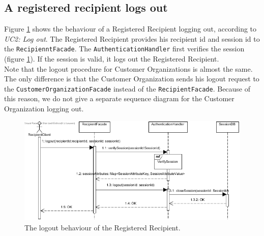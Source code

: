 \documentclass[a4paper,10pt]{article}
\begin{document}
\subsection{A registered recipient logs out}
\label{scenario:RegRecipLogOut}
Figure \ref{fig:seq_UC2LogOut} shows the behaviour of a Registered Recipient logging out, according to \emph{UC2: Log out}. The Registered Recipient provides his recipient id and session id to the \texttt{RecipienntFacade}. The \texttt{AuthenticationHandler} first verifies the session (figure \ref{fig:seq_UC2LogOut}). If the session is valid, it logs out the Registered Recipient.\\ Note that the logout procedure for Customer Organizations is almost the same. The only difference is that the Customer Organization sends his logout request to the \texttt{CustomerOrganizationFacade} instead of the \texttt{RecipientFacade}. Because of this reason, we do not give a separate sequence diagram for the Customer Organization logging out.

\begin{figure}[!htp]
    \centering
    \includegraphics[width=\textwidth]{Seq_UC2LogOut.png}
    \caption{The logout behaviour of the Registered Recipient.
        }\label{fig:seq_UC2LogOut}
\end{figure}
\end{document}
